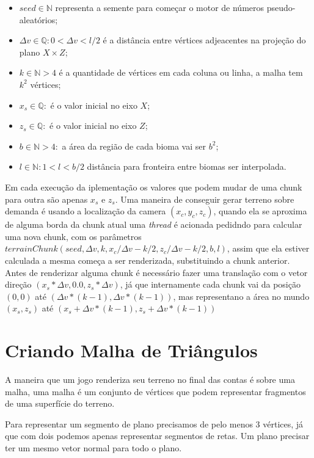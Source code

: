 \begin{itemize}
    \item $seed \in \mathbb{N}$ representa a semente para começar o motor de números
    pseudo-aleatórios;
    \item $\Delta{v} \in \mathbb{Q}:0 < \Delta{v} < l/2$ é a distância entre vértices adjeacentes na
    projeção do plano $X \times Z$;
    \item $k \in \mathbb{N}>4$ é a quantidade de vértices em cada coluna ou 
    linha, a malha tem $k^2$ vértices;
    \item $x_{s} \in \mathbb{Q}:$ é o valor inicial no eixo $X$;
    \item $z_{s} \in \mathbb{Q}:$ é o valor inicial no eixo $Z$;
    \item $b \in \mathbb{N}>4:$ a área da região de cada bioma vai ser $b^2$;
    \item $l \in \mathbb{N}:1 < l < b/2$ distância para fronteira entre biomas ser interpolada.
\end{itemize}


Em cada execução da iplementação os valores que podem mudar de uma chunk para 
outra são apenas $x_{s}$ e $z_{s}$. Uma maneira de conseguir gerar terreno sobre demanda
é usando a localização da camera $(x_{c}, y_{c}, z_{c})$, quando ela se
aproxima de alguma borda da chunk atual
uma \textit{thread} é acionada pedidndo para calcular uma nova chunk, com os parâmetros
$terrainChunk(seed, \Delta{v}, k, x_{c}/\Delta{v} - k/2, z_{c}/\Delta{v} - k/2, b, l)$, assim que ela %
estiver calculada a mesma começa a ser renderizada, substituindo a chunk anterior.
Antes de renderizar alguma chunk é necessário fazer uma translação com o vetor direção 
$(x_{s} * \Delta{v}, 0.0, z_{s} * \Delta{v})$, já que internamente cada chunk vai 
da posição $(0, 0)$ até $(\Delta{v}*(k-1), \Delta{v}*(k-1))$, mas representano a área 
no mundo $(x_{s}, z_{s})$ até $(x_{s} + \Delta{v}*(k-1), z_{s} + \Delta{v}*(k-1))$

\section{Criando Malha de Triângulos}
A maneira que um jogo renderiza seu terreno no final das contas é sobre uma
malha, uma malha é um conjunto de vértices que podem representar fragmentos
de uma superfície do terreno.

Para representar um segmento de plano precisamos de pelo menos $3$ vértices, 
já que com dois podemos apenas representar segmentos de retas. Um plano precisar
ter um mesmo vetor normal para todo o plano.

